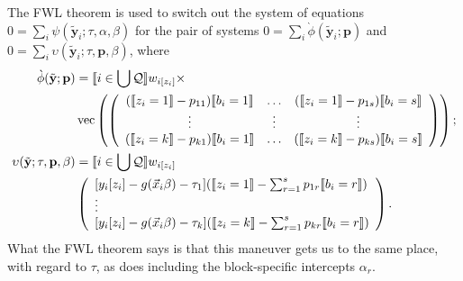 \documentclass{article}
\DeclarePairedDelimiter{\indicator}{\llbracket}{\rrbracket}
\newcommand{\owt}[1][z_i]{\ensuremath{w_{i[#1]}}}
\begin{document}
The FWL theorem is used to switch out the system of equations
$0=\sum_{i}\psi(\tilde{\mathbf{y}}_{i}; \tau, \alpha, \beta)$
for the pair of systems $0 = \sum_{i}\grave{\phi}(\tilde{\mathbf{y}}_{i}; \mathbf{p})$ and
$0= \sum_{i}\upsilon(\tilde{\mathbf{y}}_{i}; \tau, \mathbf{p},
\beta)$,  where
\begin{align}
  \grave{\phi}(\tilde{\mathbf{y}}; \mathbf{p}) &=
                                                 \indicator{i \in \bigcup \mathcal{Q}} \owt{} \times \nonumber \\
  &\operatorname{vec}\left(%
                                                 \left(
                                                 \begin{array}{ccc}
                                                   (\indicator{z_{i}=1}-p_{11})\indicator{b_{i}=1}&\ldots&(\indicator{z_{i}=1}-p_{1s})\indicator{b_{i}=s}
                                                   \\
                                                   \vdots & \vdots &
                                                                     \vdots
                                                   \\
                                                   (\indicator{z_{i}=k}-p_{k1})\indicator{b_{i}=1}&\ldots&(\indicator{z_{i}=k}-p_{ks})\indicator{b_{i}=s}\\                                                   
                                                 \end{array}
  \right)%
  \right) ;\nonumber \\
  \upsilon(\tilde{\mathbf{y}}; \tau, \mathbf{p}, \beta) &=
\indicator{i \in \bigcup \mathcal{Q}}\owt{} \nonumber \\
&\left(
                                             \begin{array}{l}                                               
           [y_{i}[z_{i}]
                                               -
                                               g(\vec{x}_{i}\beta)-\tau_{1}](
                                               \indicator{z_{i}=1} - \sum_{r=1}^{s}p_{1r}\indicator{b_{i}=r})\\
                  \vdots \\
{}           [y_{i}[z_{i}]
                                               - g(\vec{x}_{i}\beta) -
                                               \tau_{k}](\indicator{z_{i}=k}
                                               - \sum_{r=1}^{s}p_{kr}\indicator{b_{i}=r})\\                                             \end{array}
\right) . \label{eq:upsilondef}
\end{align}
What the FWL theorem says is that this maneuver gets us to the same
place, with regard to $\tau$, as does including the block-specific
intercepts $\alpha_{r}$.
\end{document}
